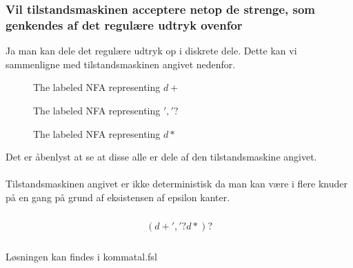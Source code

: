 \subsubsection{Vil tilstandsmaskinen acceptere netop de strenge, som genkendes af det regulære udtryk ovenfor}
Ja man kan dele det regulære udtryk op i diskrete dele. Dette kan vi sammenligne med tilstandsmaskinen angivet nedenfor.\\
\begin{figure}[!ht]\label{fig:dplus}
    \centering
    \caption{The labeled NFA representing $d+$}
\end{figure}
\begin{figure}[!ht]\label{fig:comma}
    \centering
    \caption{The labeled NFA representing $','?$}
\end{figure}
\begin{figure}[!ht]\label{fig:dopt}
    \centering
    \caption{The labeled NFA representing $d*$}
\end{figure}
Det er åbenlyst at se at disse alle er dele af den tilstandsmaskine angivet.\\\\
Tilstandsmaskinen angivet er ikke deterministisk da man kan være i flere knuder på en gang på grund af eksistensen af epsilon kanter.
\newpage
\subsubsection{}
\begin{align}
    (d+','?d*)?
\end{align}
\subsubsection{}
Løsningen kan findes i kommatal.fsl